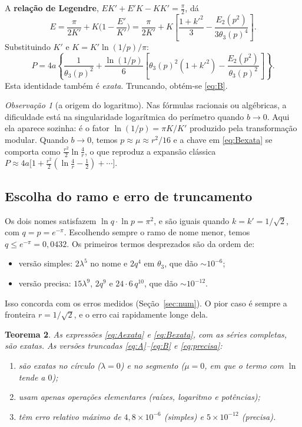 \documentclass[11pt,a4paper]{article}
\newtheorem{teorema}{Teorema}
\theoremstyle{remark}
\newtheorem{observacao}[teorema]{Observação}
\begin{document}
A \textbf{relação de Legendre}, $EK'+E'K-KK'=\frac\pi2$, dá
\[
E=\frac{\pi}{2K'}+K\Big(1-\frac{E'}{K'}\Big)
=\frac{\pi}{2K'}+K\left[\frac{1+k'^2}{3}-\frac{E_2(p^2)}{3\theta_3(p)^4}\right].
\]
Substituindo $K'$ e $K=K'\ln(1/p)/\pi$:
\begin{equation}\label{eq:Bexata}
P=4a\left\{\frac{1}{\theta_3(p)^2}+\frac{\ln(1/p)}{6}\left[\theta_3(p)^2(1+k'^2)-\frac{E_2(p^2)}{\theta_3(p)^2}\right]\right\}.
\end{equation}
Esta identidade também é \emph{exata}. Truncando, obtém-se \eqref{eq:B}.

\begin{observacao}[a origem do logaritmo]
Nas fórmulas racionais ou algébricas, a dificuldade está na singularidade logarítmica do
perímetro quando $b\to0$. Aqui ela aparece sozinha: é o fator
$\ln(1/p)=\pi K/K'$ produzido pela transformação modular. Quando $b\to0$,
temos $p\approx\mu\approx r^2/16$ e a chave em \eqref{eq:Bexata} se comporta como $\tfrac{r^2}{2}\ln\tfrac{4}{r}$, o que
reproduz a expansão clássica $P\approx4a\big[1+\frac{r^2}{2}(\ln\frac4r-\frac12)+\cdots\big]$.
\end{observacao}

\subsection{Escolha do ramo e erro de truncamento}

Os dois nomes satisfazem $\ln q\cdot\ln p=\pi^2$, e são iguais quando $k=k'=1/\sqrt2$, com
$q=p=e^{-\pi}$. Escolhendo sempre o ramo de nome menor, temos
$q\le e^{-\pi}=0{,}0432$. Os primeiros termos desprezados são da ordem de:
\begin{itemize}
\item versão simples: $2\lambda^5$ no nome e $2q^4$ em $\theta_3$, que dão $\sim10^{-6}$;
\item versão precisa: $15\lambda^9$, $2q^9$ e $24\cdot6\,q^{10}$, que dão $\sim10^{-12}$.
\end{itemize}
Isso concorda com os erros medidos (Seção~\ref{sec:num}). O pior caso é sempre a fronteira
$r=1/\sqrt2$, e o erro cai rapidamente longe dela.

\begin{teorema}
As expressões \eqref{eq:Aexata} e \eqref{eq:Bexata}, com as séries completas, são exatas. As
versões truncadas \eqref{eq:A}–\eqref{eq:B} e \eqref{eq:precisa}:
\begin{enumerate}
\item são exatas no círculo ($\lambda=0$) e no segmento ($\mu=0$, em que o termo com $\ln$ tende a $0$);
\item usam apenas operações elementares (raízes, logaritmo e potências);
\item têm erro relativo máximo de $4{,}8\times10^{-6}$ (simples) e $5\times10^{-12}$ (precisa).
\end{enumerate}
\end{teorema}
\end{document}
